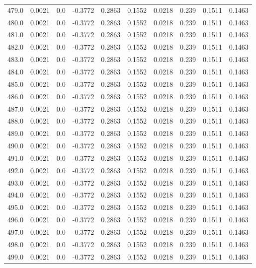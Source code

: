 \begin{longtable}{lrrrrrrrrr}
479.0 & 0.0021 & 0.0 & -0.3772 & 0.2863 & 0.1552 & 0.0218 & 0.239 & 0.1511 & 0.1463 \\
480.0 & 0.0021 & 0.0 & -0.3772 & 0.2863 & 0.1552 & 0.0218 & 0.239 & 0.1511 & 0.1463 \\
481.0 & 0.0021 & 0.0 & -0.3772 & 0.2863 & 0.1552 & 0.0218 & 0.239 & 0.1511 & 0.1463 \\
482.0 & 0.0021 & 0.0 & -0.3772 & 0.2863 & 0.1552 & 0.0218 & 0.239 & 0.1511 & 0.1463 \\
483.0 & 0.0021 & 0.0 & -0.3772 & 0.2863 & 0.1552 & 0.0218 & 0.239 & 0.1511 & 0.1463 \\
484.0 & 0.0021 & 0.0 & -0.3772 & 0.2863 & 0.1552 & 0.0218 & 0.239 & 0.1511 & 0.1463 \\
485.0 & 0.0021 & 0.0 & -0.3772 & 0.2863 & 0.1552 & 0.0218 & 0.239 & 0.1511 & 0.1463 \\
486.0 & 0.0021 & 0.0 & -0.3772 & 0.2863 & 0.1552 & 0.0218 & 0.239 & 0.1511 & 0.1463 \\
487.0 & 0.0021 & 0.0 & -0.3772 & 0.2863 & 0.1552 & 0.0218 & 0.239 & 0.1511 & 0.1463 \\
488.0 & 0.0021 & 0.0 & -0.3772 & 0.2863 & 0.1552 & 0.0218 & 0.239 & 0.1511 & 0.1463 \\
489.0 & 0.0021 & 0.0 & -0.3772 & 0.2863 & 0.1552 & 0.0218 & 0.239 & 0.1511 & 0.1463 \\
490.0 & 0.0021 & 0.0 & -0.3772 & 0.2863 & 0.1552 & 0.0218 & 0.239 & 0.1511 & 0.1463 \\
491.0 & 0.0021 & 0.0 & -0.3772 & 0.2863 & 0.1552 & 0.0218 & 0.239 & 0.1511 & 0.1463 \\
492.0 & 0.0021 & 0.0 & -0.3772 & 0.2863 & 0.1552 & 0.0218 & 0.239 & 0.1511 & 0.1463 \\
493.0 & 0.0021 & 0.0 & -0.3772 & 0.2863 & 0.1552 & 0.0218 & 0.239 & 0.1511 & 0.1463 \\
494.0 & 0.0021 & 0.0 & -0.3772 & 0.2863 & 0.1552 & 0.0218 & 0.239 & 0.1511 & 0.1463 \\
495.0 & 0.0021 & 0.0 & -0.3772 & 0.2863 & 0.1552 & 0.0218 & 0.239 & 0.1511 & 0.1463 \\
496.0 & 0.0021 & 0.0 & -0.3772 & 0.2863 & 0.1552 & 0.0218 & 0.239 & 0.1511 & 0.1463 \\
497.0 & 0.0021 & 0.0 & -0.3772 & 0.2863 & 0.1552 & 0.0218 & 0.239 & 0.1511 & 0.1463 \\
498.0 & 0.0021 & 0.0 & -0.3772 & 0.2863 & 0.1552 & 0.0218 & 0.239 & 0.1511 & 0.1463 \\
499.0 & 0.0021 & 0.0 & -0.3772 & 0.2863 & 0.1552 & 0.0218 & 0.239 & 0.1511 & 0.1463 \\

\end{longtable}
